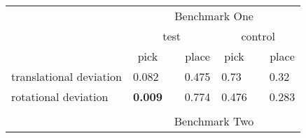 \documentclass[a4paper]{article}
\begin{document}
\begin{table}[]
	\begin{tabular}{lclllll}
		\cline{2-7}
		\multicolumn{1}{l|}{}                         & \multicolumn{6}{c|}{Benchmark One}                                                                                                                                                                                                                                                                            \\ \cline{2-7} 
		\multicolumn{1}{c|}{}                         & \multicolumn{3}{c|}{test}                                                                                                                             & \multicolumn{3}{c|}{control}                                                                                                                          \\ \cline{2-7} 
		\multicolumn{1}{c|}{}                         & \multicolumn{1}{c|}{pick}                        & \multicolumn{1}{c|}{}                          & \multicolumn{1}{c|}{place}                        & \multicolumn{1}{c|}{pick}                        & \multicolumn{1}{c|}{}                          & \multicolumn{1}{c|}{place}                        \\ \cline{1-2} \cline{4-5} \cline{7-7} 
		\multicolumn{1}{|l|}{translational deviation} & \multicolumn{1}{l|}{0.082}                       & \multicolumn{1}{l|}{}                          & \multicolumn{1}{l|}{0.475}                        & \multicolumn{1}{l|}{0.73}                        & \multicolumn{1}{l|}{}                          & \multicolumn{1}{l|}{0.32}                         \\ \cline{1-2} \cline{4-5} \cline{7-7} 
		\multicolumn{1}{|l|}{rotational deviation}    & \multicolumn{1}{l|}{\textbf{0.009}}                       & \multicolumn{1}{l|}{}                          & \multicolumn{1}{l|}{0.774}                        & \multicolumn{1}{l|}{0.476}                       & \multicolumn{1}{l|}{}                          & \multicolumn{1}{l|}{0.283}                        \\ \hline
		& \multicolumn{1}{l}{}                             &                                                &                                                   &                                                  &                                                &                                                   \\ \cline{2-7} 
		\multicolumn{1}{l|}{}                         & \multicolumn{6}{c|}{Benchmark Two}                                                                                                                                                                                                                                                                            \\ \cline{2-7} 

\end{tabular}
\end{table}
\end{document}
